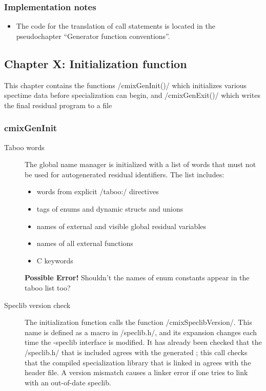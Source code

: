 \begin{docpart}
\subsubsection{Implementation notes}
\begin{itemize}
\item The code for the translation of call statements is located in
	the pseudochapter ``Generator function conventions''.
\end{itemize}

\subsection{Chapter X: Initialization function}
This chapter contains the functions /cmixGenInit()/ which initializes
various spectime data before specialization can begin, and
/cmixGenExit()/ which writes the final residual program to a file
\subsubsection{cmixGenInit}
\begin{description}
\item[Taboo words] The global name manager is initialized with a
	list of words that must not be used for autogenerated residual
	identifiers. The list includes:
	\begin{itemize}
	\item words from explicit /taboo:/ directives
	\item tags of enums and dynamic structs and unions
	\item names of external and visible global residual variables
	\item names of all external functions
	\item C keywords
	\end{itemize}

	\textbf{Possible Error!} Shouldn't the names of enum constants
	appear in the taboo list too?

\item[Speclib version check] The initialization function calls the
	function /cmixSpeclibVersion/. This name is defined as a
	macro in /speclib.h/, and its expansion changes each time
	the \Pgen-speclib interface is modified. It has already been
	checked that the /speclib.h/ that is included agrees with
	the generated \Pgen; this call checks that the compiled
	specialization library that is linked in agrees with the
	header file. A version mismatch causes a linker error if
	one tries to link with an out-of-date speclib.


\end{description}
\end{docpart}
